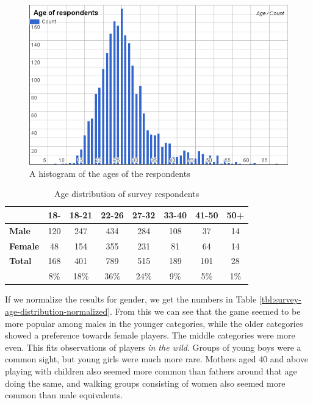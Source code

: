 \begin{figure}[h]
	\centering
	\includegraphics[width=\textwidth]{Figures/age-histogram}
	\caption{A histogram of the ages of the respondents}
	\label{fig:respondents-age-histogram}
\end{figure}

\begin{table}[h]
	\centering
	\caption{Age distribution of survey respondents}
	\label{tbl:survey-age-distribution}
	\begin{tabular}{|l||c|c|c|c|c|c|c|}
		\hline
		&\textbf{18-} & \textbf{18-21} & \textbf{22-26} & \textbf{27-32} & \textbf{33-40} & \textbf{41-50} & \textbf{50+}\\
		\hline\hline
		\textbf{Male} & 120 & 247 & 434 & 284 & 108 & 37 & 14 \\
		\hline
		\textbf{Female} & 48 & 154 & 355 & 231 & 81 & 64 & 14 \\
		\hline
		\textbf{Total} & 168 & 401 & 789 & 515 & 189 & 101 & 28 \\
					& 8\% & 18\% & 36\% & 24\% & 9\% & 5\% & 1\%\\
		\hline
	\end{tabular}
\end{table}

If we normalize the results for gender, we get the numbers in Table \ref{tbl:survey-age-distribution-normalized}. From this we can see that the game seemed to be more popular among males in the younger categories, while the older categories showed a preference towards female players. The middle categories were more even. This fits observations of players \emph{in the wild}. Groups of young boys were a common sight, but young girls were much more rare. Mothers aged 40 and above playing with children also seemed more common than fathers around that age doing the same, and walking groups consisting of women also seemed more common than male equivalents.

